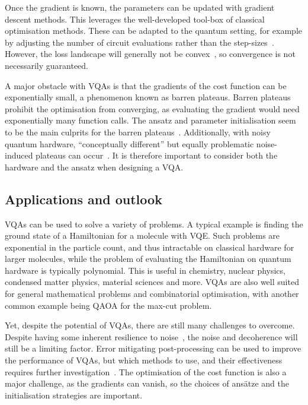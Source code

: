 Once the gradient is known, the parameters can be updated with gradient descent methods.
This leverages the well-developed tool-box of classical optimisation methods.
These can be adapted to the quantum setting, for example by adjusting the number of circuit evaluations rather than the step-sizes~\autocite{sweke2020}.
However, the loss landscape will generally not be convex~\autocite{huembeli2021}, so convergence is not necessarily guaranteed.

A major obstacle with VQAs is that the gradients of the cost function can be exponentially small, a phenomenon known as barren plateaus.
Barren plateaus prohibit the optimisation from converging, as evaluating the gradient would need exponentially many function calls.
The ansatz and parameter initialisation seem to be the main culprits for the barren plateaus~\autocite{mcclean2018, cerezo2021a}.
Additionally, with noisy quantum hardware, \enquote{conceptually different} but equally problematic noise-induced plateaus can occur~\autocite{wang2021}.
It is therefore important to consider both the hardware and the ansatz when designing a VQA.

\subsection{Applications and outlook}
VQAs can be used to solve a variety of problems.
A typical example is finding the ground state of a Hamiltonian for a molecule with VQE.
Such problems are exponential in the particle count, and thus intractable on classical hardware for larger molecules, while the problem of evaluating the Hamiltonian on quantum hardware is typically polynomial.
This is useful in chemistry, nuclear physics, condensed matter physics, material sciences and more.
VQAs are also well suited for general mathematical problems and combinatorial optimisation, with another common example being QAOA for the max-cut problem.

Yet, despite the potential of VQAs, there are still many challenges to overcome.
Despite having some inherent resilience to noise~\autocite{cerezo2021}, the noise and decoherence will still be a limiting factor.
Error mitigating post-processing can be used to improve the performance of VQAs, but which methods to use, and their effectiveness requires further investigation~\autocite{endo2021}.
The optimisation of the cost function is also a major challenge, as the gradients can vanish, so the choices of ansätze and the initialisation strategies are important.

